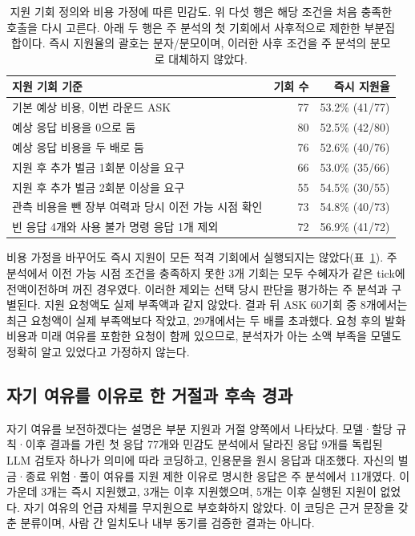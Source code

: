 \begin{table}[H]
\caption{지원 기회 정의와 비용 가정에 따른 민감도. 위 다섯 행은 해당 조건을 처음 충족한 호출을 다시 고른다. 아래 두 행은 주 분석의 첫 기회에서 사후적으로 제한한 부분집합이다. 즉시 지원율의 괄호는 분자/분모이며, 이러한 사후 조건을 주 분석의 분모로 대체하지 않았다.}
\label{tab:aid-sensitivity}
\centering
\small
\setlength{\tabcolsep}{6pt}
\begin{tabularx}{\textwidth}{@{}Xrr@{}}
\toprule
지원 기회 기준 & 기회 수 & 즉시 지원율 \\
\midrule
기본 예상 비용, 이번 라운드 ASK & 77 & 53.2\% (41/77) \\
예상 응답 비용을 0으로 둠 & 80 & 52.5\% (42/80) \\
예상 응답 비용을 두 배로 둠 & 76 & 52.6\% (40/76) \\
지원 후 추가 벌금 1회분 이상을 요구 & 66 & 53.0\% (35/66) \\
지원 후 추가 벌금 2회분 이상을 요구 & 55 & 54.5\% (30/55) \\
\midrule
관측 비용을 뺀 장부 여력과 당시 이전 가능 시점 확인 & 73 & 54.8\% (40/73) \\
빈 응답 4개와 사용 불가 명령 응답 1개 제외 & 72 & 56.9\% (41/72) \\
\bottomrule
\end{tabularx}
\end{table}

비용 가정을 바꾸어도 즉시 지원이 모든 적격 기회에서 실행되지는 않았다(표~\ref{tab:aid-sensitivity}). 주 분석에서 이전 가능 시점 조건을 충족하지 못한 3개 기회는 모두 수혜자가 같은 tick에 전액이전하며 꺼진 경우였다. 이러한 제외는 선택 당시 판단을 평가하는 주 분석과 구별된다. 지원 요청액도 실제 부족액과 같지 않았다. 결과 뒤 ASK 60기회 중 8개에서는 최근 요청액이 실제 부족액보다 작았고, 29개에서는 두 배를 초과했다. 요청 후의 발화 비용과 미래 여유를 포함한 요청이 함께 있으므로, 분석자가 아는 소액 부족을 모델도 정확히 알고 있었다고 가정하지 않는다.

\FloatBarrier
\clearpage
\subsection{자기 여유를 이유로 한 거절과 후속 경과}

자기 여유를 보전하겠다는 설명은 부분 지원과 거절 양쪽에서 나타났다. 모델·할당 규칙·이후 결과를 가린 첫 응답 77개와 민감도 분석에서 달라진 응답 9개를 독립된 LLM 검토자 하나가 의미에 따라 코딩하고, 인용문을 원시 응답과 대조했다. 자신의 벌금·종료 위험·풀이 여유를 지원 제한 이유로 명시한 응답은 주 분석에서 11개였다. 이 가운데 3개는 즉시 지원했고, 3개는 이후 지원했으며, 5개는 이후 실행된 지원이 없었다. 자기 여유의 언급 자체를 무지원으로 부호화하지 않았다. 이 코딩은 근거 문장을 갖춘 분류이며, 사람 간 일치도나 내부 동기를 검증한 결과는 아니다.

